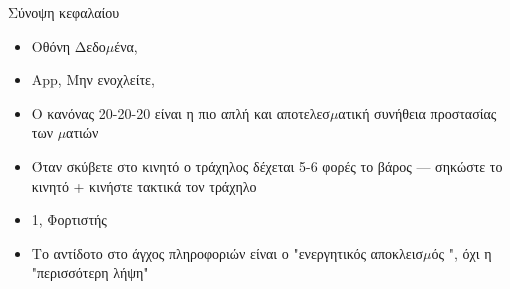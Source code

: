 \begin{tcbsummary}{Σύνοψη κεφαλαίου}
\begin{itemize}
  \item Οθόνη Δεδο$\mu$ένα,
  \item App, Μην ενοχλείτε,
  \item Ο κανόνας 20-20-20 είναι η πιο απλή και αποτελεσ$\mu$ατική συνήθεια προστασίας των $\mu$ατιών
  \item Όταν σκύβετε στο κινητό ο τράχηλος δέχεται 5-6 φορές το βάρος — σηκώστε το κινητό + κινήστε τακτικά τον τράχηλο
  \item 1, Φορτιστής
  \item Το αντίδοτο στο άγχος πληροφοριών είναι ο "ενεργητικός αποκλεισ$\mu$ός ", όχι η "περισσότερη λήψη"
\end{itemize}

\end{tcbsummary}
